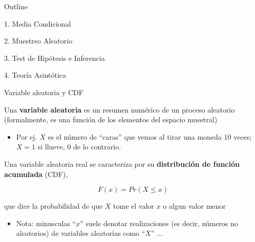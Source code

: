 \documentclass[11pt,handout,aspectratio=169]{beamer}
\newenvironment{wideitemize}{\itemize\addtolength{\itemsep}{10pt}}{\enditemize}
\begin{document}
	
	
	\begin{frame}{Outline}
	
	1. Media Condicional
	\vspace{0.8cm}
	
	
	2. Muestreo Aleatorio
	
	\vspace{0.8cm}
	3. Test de Hipótesis e Inferencia
	
		\vspace{0.8cm}
	4. Teoría Asintótica	
\end{frame}


\begin{frame}{Variable aleatoria y CDF}
\begin{wideitemize}
\item
Una \textbf{variable aleatoria} es un resumen numérico de un proceso aleatorio (formalmente, es una función de los elementos del espacio muestral)

\begin{itemize}
\item Por ej. $X$ es el número de ``caras'' que vemos al tirar una moneda 10 veces; $X=1$ si llueve, 0 de lo contrario. 
\end{itemize}
\pause{}

\item Una variable aleatoria real se caracteriza por su \textbf{distribución de función acumulada} (CDF), 

$$F(x) = Pr( X \leq x ) $$

\noindent que dice la probabilidad de que $X$ tome el valor $x$ o algun valor menor
\medskip\pause{}
\begin{itemize}
\item Nota: minusculas ``$x$'' suele denotar realizaciones (es decir, números no aleatorios) de variables aleatorias como ``$X$'' ...
\end{itemize}

\end{wideitemize}
\end{frame} 	
	
	
\end{document}
